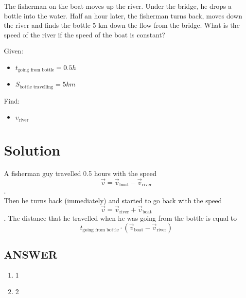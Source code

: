 The fisherman on the boat moves up the river. Under the bridge, he drops a bottle into the water.
Half an hour later, the fisherman turns back, moves down the river and finds the bottle 5 km
down the flow from the bridge. What is the speed of the river if the speed of the boat is constant?

\bigbreak Given: \begin{itemize}
    \item $t_{\text{going from bottle}} = 0.5h$
    \item $S_{\text{bottle travelling}} = 5km$
\end{itemize}

Find: \begin{itemize}
    \item $v_{\text{river}}$
\end{itemize}

\section*{Solution}

A fisherman guy travelled 0.5 hours with the speed $$\Vec{v} = \Vec{v}_{\text{boat}} - \Vec{v}_{\text{river}}$$.
\\ Then he turns back (immediately) and started to go back with the speed $$\Vec{v} = \Vec{v}_{\text{river}} + \Vec{v}_{\text{boat}}$$.
\bigbreak The distance that he travelled when he was going from the bottle is equal to $$t_{\text{going from bottle}} \cdot (\Vec{v}_{\text{boat}} - \Vec{v}_{\text{river}})$$



\vfill
\subsection*{ANSWER}
\begin{enumerate}
    \item 1
    \item 2
\end{enumerate}

